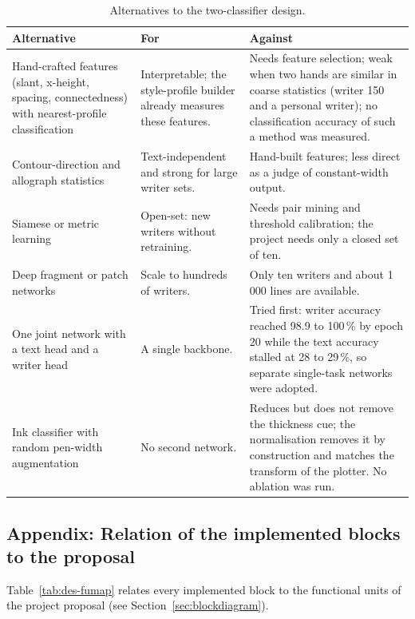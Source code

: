 \begin{table}[h]
\centering
\fontsize{9.5}{11.5}\selectfont
\begin{tabularx}{\linewidth}{|p{3.4cm}|X|X|}
\hline
\textbf{Alternative} & \textbf{For} & \textbf{Against} \\
\hline
Hand-crafted features (slant, x-height, spacing, connectedness) with nearest-profile classification &
Interpretable; the style-profile builder already measures these features. &
Needs feature selection; weak when two hands are similar in coarse statistics (writer 150 and a personal writer); no classification accuracy of such a method was measured. \\
\hline
Contour-direction and allograph statistics \cite{bulacu2007} &
Text-independent and strong for large writer sets. &
Hand-built features; less direct as a judge of constant-width output. \\
\hline
Siamese or metric learning &
Open-set: new writers without retraining. &
Needs pair mining and threshold calibration; the project needs only a closed set of ten. \\
\hline
Deep fragment or patch networks \cite{he2020} &
Scale to hundreds of writers. &
Only ten writers and about 1\,000 lines are available. \\
\hline
One joint network with a text head and a writer head &
A single backbone. &
Tried first: writer accuracy reached 98.9 to 100\,\% by epoch 20 while the text accuracy stalled at 28 to 29\,\%, so separate single-task networks were adopted. \\
\hline
Ink classifier with random pen-width augmentation &
No second network. &
Reduces but does not remove the thickness cue; the normalisation removes it by construction and matches the transform of the plotter. No ablation was run. \\
\hline
\end{tabularx}
\caption{Alternatives to the two-classifier design.}
\label{tab:wid-alt}
\end{table}


\subsection{Appendix: Relation of the implemented blocks to the proposal}

Table~\ref{tab:des-fumap} relates every implemented block to the functional units of the project proposal (see Section~\ref{sec:blockdiagram}).

